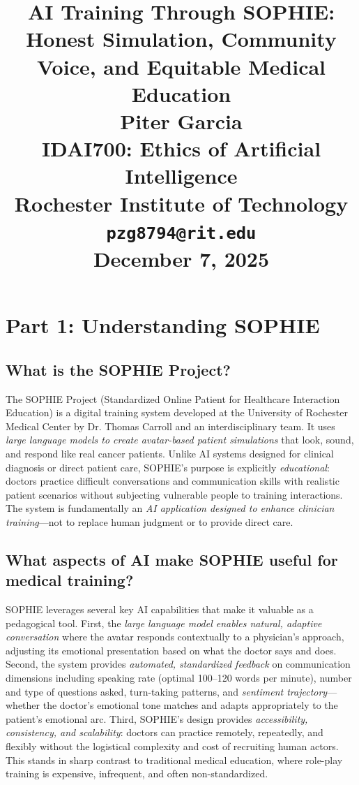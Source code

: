 \documentclass[12pt,twoside]{article}
\title{
\vspace*{1.5in}
\textbf{\Huge AI Training Through SOPHIE:}\\[0.5em]
\textbf{\Huge Honest Simulation, Community Voice, and Equitable Medical Education}\\[1.5em]

\vfill
\Huge \textbf{Piter Garcia}\\
\LARGE IDAI700: Ethics of Artificial Intelligence\\
Rochester Institute of Technology\\
\texttt{pzg8794@rit.edu}\\

\vfill
\Huge \textbf{December 7, 2025}
}
\author{}
\date{}
\begin{document}
\thispagestyle{empty}
\maketitle
\newpage

\pagestyle{fancy}

\section*{Part 1: Understanding SOPHIE}

\subsection*{What is the SOPHIE Project?}

The SOPHIE Project (Standardized Online Patient for Healthcare Interaction Education) is a digital training system developed at the University of Rochester Medical Center by Dr. Thomas Carroll and an interdisciplinary team. It uses \emph{large language models to create avatar-based patient simulations} that look, sound, and respond like real cancer patients. Unlike AI systems designed for clinical diagnosis or direct patient care, SOPHIE's purpose is explicitly \emph{educational}: doctors practice difficult conversations and communication skills with realistic patient scenarios without subjecting vulnerable people to training interactions. The system is fundamentally an \emph{AI application designed to enhance clinician training}—not to replace human judgment or to provide direct care.

\subsection*{What aspects of AI make SOPHIE useful for medical training?}

SOPHIE leverages several key AI capabilities that make it valuable as a pedagogical tool. First, the \emph{large language model enables natural, adaptive conversation} where the avatar responds contextually to a physician's approach, adjusting its emotional presentation based on what the doctor says and does. Second, the system provides \emph{automated, standardized feedback} on communication dimensions including speaking rate (optimal 100--120 words per minute), number and type of questions asked, turn-taking patterns, and \emph{sentiment trajectory}—whether the doctor's emotional tone matches and adapts appropriately to the patient's emotional arc. Third, SOPHIE's design provides \emph{accessibility, consistency, and scalability}: doctors can practice remotely, repeatedly, and flexibly without the logistical complexity and cost of recruiting human actors. This stands in sharp contrast to traditional medical education, where role-play training is expensive, infrequent, and often non-standardized.
\end{document}

